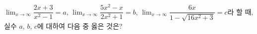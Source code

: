 $\displaystyle\lim_{x\to\infty}\dfrac{2x+3}{x^2-1}=a$, $\displaystyle\lim_{x\to\infty}\dfrac{5x^2-x}{2x^2+1}=b$, $\displaystyle\lim_{x\to\infty}\dfrac{6x}{1-\sqrt{16x^2+3}}=c$라 할 때, 실수 $a$, $b$, $c$에 대하여 다음 중 옳은 것은?

